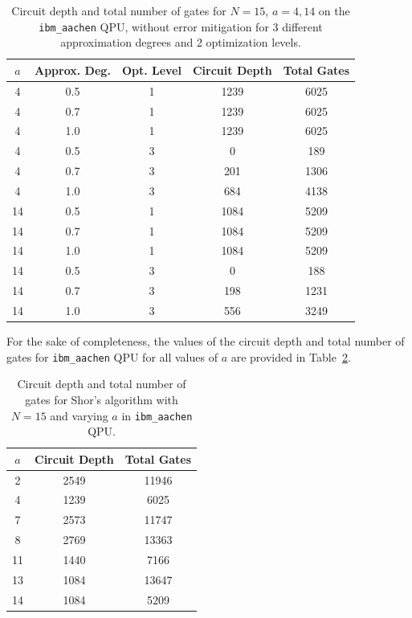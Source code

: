 \documentclass[conference,twoside]{IEEEtran}
\begin{document}
\begin{table}[h]
\centering
\caption{Circuit depth and total number of gates for $N=15$, $a=4, 14$ on the \texttt{ibm\_aachen} QPU, without error mitigation for 3 different approximation degrees and 2 optimization levels. }
\label{tab:Aachen_circuit_depth_total_gates_vs_approxdeg_optim}
\begin{tabular}{c c c c c}
\toprule
\textbf{$a$} & \textbf{Approx. Deg.} & \textbf{Opt. Level} & \textbf{Circuit Depth} & \textbf{Total Gates} \\
\midrule
4 & 0.5 & 1 & 1239 & 6025 \\
4 & 0.7 & 1 & 1239 & 6025 \\
4 & 1.0 & 1 & 1239 & 6025 \\
4 & 0.5 & 3 & 0 & 189 \\
4 & 0.7 & 3 & 201 & 1306 \\
4 & 1.0 & 3 & 684 & 4138 \\
\midrule
14 & 0.5 & 1 & 1084 & 5209 \\
14 & 0.7 & 1 & 1084 & 5209 \\
14 & 1.0 & 1 & 1084 & 5209 \\
14 & 0.5 & 3 & 0 & 188 \\
14 & 0.7 & 3 & 198 & 1231 \\
14 & 1.0 & 3 & 556 & 3249 \\
\bottomrule
\end{tabular}
\end{table}

For the sake of completeness, the values of the circuit depth and total number of gates for \texttt{ibm\_aachen} QPU for all values of $a$ are provided in Table~\ref{tab:Aachen_circuit_depth_total_gates_vs_a}.

\begin{table}[h]
    \centering
    \caption{Circuit depth and total number of gates for Shor's algorithm with $N = 15$ and varying $a$ in \texttt{ibm\_aachen} QPU.}
    \label{tab:Aachen_circuit_depth_total_gates_vs_a}
    \begin{tabular}{ccc}
        \toprule
        $a$ & Circuit Depth & Total Gates \\
        \midrule
        2  & 2549 & 11946 \\
        4  & 1239 & 6025  \\
        7  & 2573 & 11747 \\
        8  & 2769 & 13363 \\
        11 & 1440 & 7166  \\
        13 & 1084 & 13647 \\
        14 & 1084 & 5209  \\
        \bottomrule
    \end{tabular}
\end{table}
\end{document}
